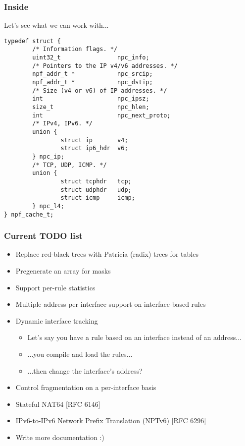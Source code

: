 \documentclass[magyar]{beamer}
\begin{document}
\begin{frame}[fragile]
\frametitle{Inside}
Let's see what we can work with...
{\tiny
\begin{verbatim}
typedef struct {
        /* Information flags. */
        uint32_t                npc_info;
        /* Pointers to the IP v4/v6 addresses. */
        npf_addr_t *            npc_srcip;
        npf_addr_t *            npc_dstip;
        /* Size (v4 or v6) of IP addresses. */
        int                     npc_ipsz;
        size_t                  npc_hlen;
        int                     npc_next_proto;
        /* IPv4, IPv6. */
        union {
                struct ip       v4;
                struct ip6_hdr  v6;
        } npc_ip;
        /* TCP, UDP, ICMP. */
        union {
                struct tcphdr   tcp;
                struct udphdr   udp;
                struct icmp     icmp;
        } npc_l4;
} npf_cache_t;
\end{verbatim}
}
\end{frame}

\begin{frame}
\frametitle{Current TODO list}
\begin{itemize}
	\item Replace red-black trees with Patricia (radix) trees for tables
\pause
	\item Pregenerate an array for masks
\pause
	\item Support per-rule statistics
\pause
	\item Multiple address per interface support on interface-based rules
	\item Dynamic interface tracking
		\begin{itemize}
			\item Let's say you have a rule based on an interface instead of an address...
			\item ...you compile and load the rules...
			\item ...then change the interface's address?
		\end{itemize}
	\item Control fragmentation on a per-interface basis
\pause
	\item Stateful NAT64 [RFC 6146]
	\item IPv6-to-IPv6 Network Prefix Translation (NPTv6) [RFC 6296]
\pause
	\item Write more documentation :)
\end{itemize}
\end{frame}
\end{document}
